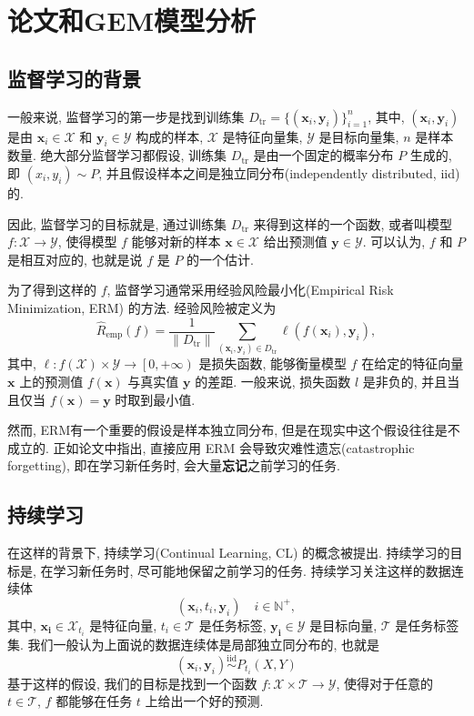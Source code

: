 \section{论文和GEM模型分析}
\subsection{监督学习的背景}
一般来说, 监督学习的第一步是找到训练集 $D_{\text{tr}}=\{(\boldsymbol{x}_i, \boldsymbol{y}_i)\}_{i=1}^n$, 其中, $(\boldsymbol{x}_i,\boldsymbol{y}_i)$ 是由 ${\boldsymbol{x}_i}\in{\mathcal{X}}$ 和 $\boldsymbol{y}_i\in \mathcal{Y}$ 构成的样本, $\mathcal{X}$ 是特征向量集, $\mathcal{Y}$ 是目标向量集, $n$ 是样本数量. 绝大部分监督学习都假设, 训练集 $D_{\text{tr}}$ 是由一个固定的概率分布 $P$ 生成的, 即 $(x_i, y_i)\sim P$, 并且假设样本之间是独立同分布(independently distributed, iid) 的. 

因此, 监督学习的目标就是, 通过训练集 $D_{\text{tr}}$ 来得到这样的一个函数, 或者叫模型 $f:\mathcal{X}\rightarrow \mathcal{Y}$, 使得模型 $f$ 能够对新的样本 $\boldsymbol{x}\in \mathcal{X}$ 给出预测值 $\boldsymbol{y}\in \mathcal{Y}$. 可以认为, $f$ 和 $P$ 是相互对应的, 也就是说 $f$ 是 $P$ 的一个估计.

为了得到这样的 $f$, 监督学习通常采用经验风险最小化(Empirical Risk Minimization, ERM) 的方法. 经验风险被定义为
\[
    \hat{R}_{\text{emp}}(f)=\frac{1}{\|D_{\text{tr}}\|}\sum_{(\boldsymbol{x}_i,\boldsymbol{y}_i)\in D_{\text{tr}}} \ell(f(\boldsymbol{x}_i), \boldsymbol{y}_i),
\]
其中, $\ell:f(\mathcal{X})\times\mathcal{Y}\rightarrow \left[\right.0,+\infty\left.\right)$ 是损失函数, 能够衡量模型 $f$ 在给定的特征向量 $\boldsymbol{x}$ 上的预测值 $f({\boldsymbol{x}})$ 与真实值 $\boldsymbol{y}$ 的差距. 一般来说, 损失函数 $l$ 是非负的, 并且当且仅当 $f({\boldsymbol{x}})=\boldsymbol{y}$ 时取到最小值.

然而, ERM有一个重要的假设是样本独立同分布, 但是在现实中这个假设往往是不成立的. 正如论文\cite{MCCLOSKEY1989109}中指出, 直接应用 ERM 会导致灾难性遗忘(catastrophic forgetting), 即在学习新任务时, 会大量\textbf{忘记}之前学习的任务.

\subsection{持续学习}
在这样的背景下, 持续学习(Continual Learning, CL) 的概念被提出. 持续学习的目标是, 在学习新任务时, 尽可能地保留之前学习的任务. 持续学习关注这样的数据连续体 
\[
    (\boldsymbol{x}_i, t_i, \boldsymbol{y}_i)\quad i\in \mathbb{N}^+,
\]
其中, $\boldsymbol{x_i}\in \mathcal{X}_{t_i}$ 是特征向量, $t_i\in \mathcal{T}$ 是任务标签, $\boldsymbol{y_i}\in \mathcal{Y}$ 是目标向量, $\mathcal{T}$ 是任务标签集. 我们一般认为上面说的数据连续体是局部独立同分布的, 也就是 
\[
    (\boldsymbol{x}_i, \boldsymbol{y}_i)\stackrel{\text{iid}}{\sim} P_{t_i}(X, Y)
\]
基于这样的假设, 我们的目标是找到一个函数 $f:\mathcal{X}\times \mathcal{T}\rightarrow \mathcal{Y}$, 使得对于任意的 $t\in \mathcal{T}$, $f$ 都能够在任务 $t$ 上给出一个好的预测.


